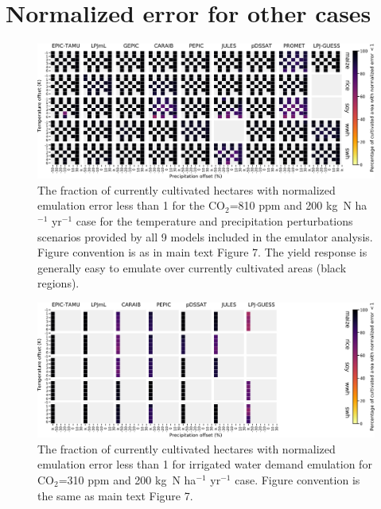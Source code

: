\documentclass[10pt]{article}
\begin{document}
{{\clearpage
\section{Normalized error for other cases}

\begin{figure}[h!]
  \centering
  \includegraphics[width=15.5cm]{error_grid_810.png}
  \caption{
  The fraction of currently cultivated hectares with normalized emulation error less than 1 for the CO$_2$=810 ppm and 200 kg~N ha$^{-1}$ yr$^{-1}$ case for the temperature and precipitation perturbations scenarios provided by all 9 models included in the emulator analysis. 
  Figure convention is as in main text Figure 7.
  The yield response is generally easy to emulate over currently cultivated areas (black regions).
  }
  \label{fig:error810}
\end{figure}

\begin{figure}[h!]
  \centering
  \includegraphics[width=15.5cm]{error_grid_360_cultivated_IWD.png}
  \caption{
  The fraction of currently cultivated hectares with normalized emulation error less than 1 for irrigated water demand emulation for CO$_2$=310 ppm and 200 kg~N ha$^{-1}$ yr$^{-1}$ case. Figure convention is the same as main text Figure 7.
  }
  \label{fig:error810}
\end{figure}

\clearpage
}}
\end{document}

